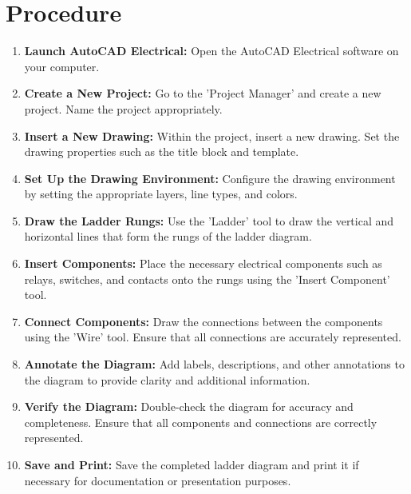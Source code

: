 \documentclass[12pt]{article}
\begin{document}
\section*{Procedure}
\begin{enumerate}
    \item \textbf{Launch AutoCAD Electrical:} Open the AutoCAD Electrical software on your computer.
    \item \textbf{Create a New Project:} Go to the 'Project Manager' and create a new project. Name the project appropriately.
    \item \textbf{Insert a New Drawing:} Within the project, insert a new drawing. Set the drawing properties such as the title block and template.
    \item \textbf{Set Up the Drawing Environment:} Configure the drawing environment by setting the appropriate layers, line types, and colors.
    \item \textbf{Draw the Ladder Rungs:} Use the 'Ladder' tool to draw the vertical and horizontal lines that form the rungs of the ladder diagram.
    \item \textbf{Insert Components:} Place the necessary electrical components such as relays, switches, and contacts onto the rungs using the 'Insert Component' tool.
    \item \textbf{Connect Components:} Draw the connections between the components using the 'Wire' tool. Ensure that all connections are accurately represented.
    \item \textbf{Annotate the Diagram:} Add labels, descriptions, and other annotations to the diagram to provide clarity and additional information.
    \item \textbf{Verify the Diagram:} Double-check the diagram for accuracy and completeness. Ensure that all components and connections are correctly represented.
    \item \textbf{Save and Print:} Save the completed ladder diagram and print it if necessary for documentation or presentation purposes.
\end{enumerate}
\end{document}

